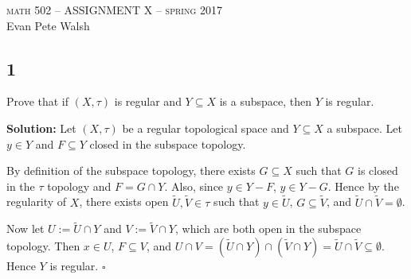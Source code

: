 \documentclass[12pt]{article}
\newcounter{ProofCounter}
\newenvironment{Solution}{\stepcounter{ProofCounter}\textbf{Solution:}}{\hfill$\square$}
\begin{document}
\thispagestyle{empty}
\begin{center}
  \Large \textsc{math 502 -- ASSIGNMENT X -- spring 2017} \\ 
  \vspace{5mm}
  \large Evan Pete Walsh
\end{center}


\subsection*{1}
\begin{tcolorbox}
  Prove that if $(X, \tau)$ is regular and $Y \subseteq X$ is a subspace, then $Y$ is regular.
\end{tcolorbox}
\begin{Solution}
  Let $(X, \tau)$ be a regular topological space and $Y \subseteq X$ a subspace. Let $y \in Y$ and $F \subseteq Y$ closed in the subspace topology.

  By definition of the subspace topology, there exists $G \subseteq X$ such that $G$ is closed in the $\tau$ topology and $F = G \cap Y$.
  Also, since $y \in Y - F$, $y \in Y - G$. Hence by the regularity of $X$, there exists open $\tilde{U}, \tilde{V} \in \tau$ such that $y \in
  \tilde{U}$, $G \subseteq \tilde{V}$, and $\tilde{U} \cap \tilde{V} = \emptyset$.

  Now let $U := \tilde{U} \cap Y$ and $V := \tilde{V} \cap Y$, which are both open in the subspace topology. Then $x \in U$, $F \subseteq V$, and 
  $U \cap V = (\tilde{U} \cap Y)  \cap ( \tilde{V} \cap Y) = \tilde{U} \cap \tilde{V} \subseteq \emptyset$. Hence $Y$ is regular.
\end{Solution}
\end{document}
